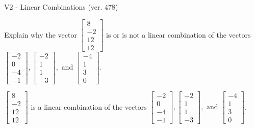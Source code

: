 \begin{exercise}
  \begin{exerciseTitle}V2 - Linear Combinations (ver. 478)\end{exerciseTitle}
  \begin{exerciseStatement}
    Explain why the vector \(\left[\begin{array}{c}
8 \\
-2 \\
12 \\
12
\end{array}\right]\)  is or is not a linear 
	combination of the vectors \(\left[\begin{array}{c}
-2 \\
0 \\
-4 \\
-1
\end{array}\right] , \left[\begin{array}{c}
-2 \\
1 \\
1 \\
-3
\end{array}\right] , \text{ and } \left[\begin{array}{c}
-4 \\
1 \\
3 \\
0
\end{array}\right]\).
	


  \end{exerciseStatement}
  \begin{exerciseAnswer}
   \(\left[\begin{array}{c}
8 \\
-2 \\
12 \\
12
\end{array}\right]\) 
  	 is  
	a linear combination of the vectors \(\left[\begin{array}{c}
-2 \\
0 \\
-4 \\
-1
\end{array}\right] , \left[\begin{array}{c}
-2 \\
1 \\
1 \\
-3
\end{array}\right] , \text{ and } \left[\begin{array}{c}
-4 \\
1 \\
3 \\
0
\end{array}\right]\).

	
  


  \end{exerciseAnswer}
\end{exercise}